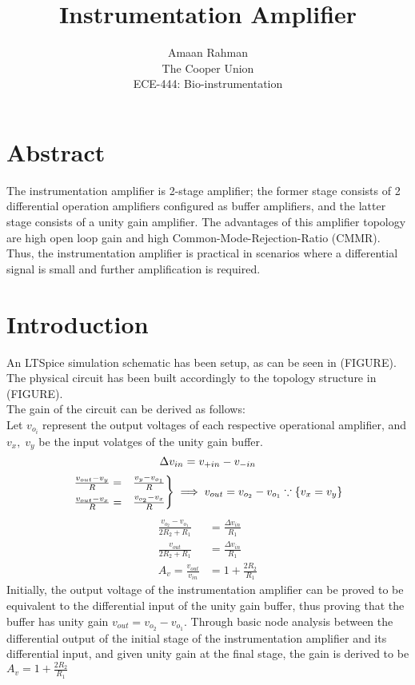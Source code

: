 \documentclass{article}
\title{Instrumentation Amplifier}
\author{Amaan Rahman \\
The Cooper Union \\
ECE-444: Bio-instrumentation}
\begin{document}
\maketitle
\section{Abstract}
The instrumentation amplifier is 2-stage amplifier; the former stage consists of 2 differential operation amplifiers configured as buffer amplifiers, and the latter stage consists of a unity gain amplifier. The advantages of this amplifier topology are high open loop gain and high Common-Mode-Rejection-Ratio (CMMR). Thus, the instrumentation amplifier is practical in scenarios where a differential signal is small and further amplification is required.

\section{Introduction}
An LTSpice simulation schematic has been setup, as can be seen in (FIGURE). The physical circuit has been built accordingly to the topology structure in (FIGURE). \\

The gain of the circuit can be derived as follows: \\
\hspace*{1cm}Let $v_{o_i}$ represent the output voltages of each respective operational amplifier, and $v_x,\;v_y$ be the input volatges of the unity gain buffer. \\
\begin{equation*}
    \Delta v_{in} = v_{+in} - v_{-in} \\
\end{equation*}
\[
    \begin{rcases}
        \frac{v_{out} - v_y}{R} =& \frac{v_y - v_{o_1}}{R} \\
        \frac{v_{out} - v_x}{R} =& \frac{v_{o_2} - v_x}{R}
    \end{rcases} \implies v_{out} = v_{o_2} - v_{o_1} \because \{v_x = v_y\}
\]
\begin{equation*}
    \begin{aligned}
        \frac{v_{o_2} - v_{o_1}}{2R_2 + R_1} & = \frac{\Delta v_{in}}{R_1} \\
        \frac{v_{out}}{2R_2 + R_1}           & = \frac{\Delta v_{in}}{R_1} \\
        A_v = \frac{v_{out}}{v_{in}}         & = 1 + \frac{2R_2}{R_1}
    \end{aligned}
\end{equation*}
Initially, the output voltage of the instrumentation amplifier can be proved to be equivalent to the differential input of the unity gain buffer, thus proving that the buffer has unity gain $v_{out} = v_{o_2} - v_{o_1}$. Through basic node analysis between the differential output of the initial stage of the instrumentation amplifier and its differential input, and given unity gain at the final stage, the gain is derived to be $A_v = 1 + \frac{2R_2}{R_1}$
\vfill
\end{document}
